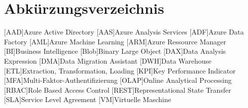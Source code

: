 \renewcommand{\chaptermark}[1]{\markboth{\spacedlowsmallcaps{#1}}{\spacedlowsmallcaps{#1}}}
\renewcommand{\sectionmark}[1]{\markright{\thesection\enspace\spacedlowsmallcaps{#1}}}
\chapter*{Abk\"{u}rzungsverzeichnis}

\begin{acronym}[OLAP]
    [AAD]{Azure Active Directory}
    [AAS]{Azure Analysis Services}
    [ADF]{Azure Data Factory}
    [AML]{Azure Machine Learning}
    [ARM]{Azure Ressource Manager}
    [BI]{Business Intelligence}
    [Blob]{Binary Large Object}
    [DAX]{Data Analysis Expression}
    [DMA]{Data Migration Assistant}
    [DWH]{Data Warehouse}
    [ETL]{Extraction, Transformation, Loading}
    [KPI]{Key Performance Indicator}
    [MFA]{Multi-Faktor-Authentifizierung}
    [OLAP]{Online Analytical Processing}
    [RBAC]{Role Based Access Control}
    [REST]{Representational State Transfer}
    [SLA]{Service Level Agreement}
    [VM]{Virtuelle Maschine}
\end{acronym}
\cleardoublepage